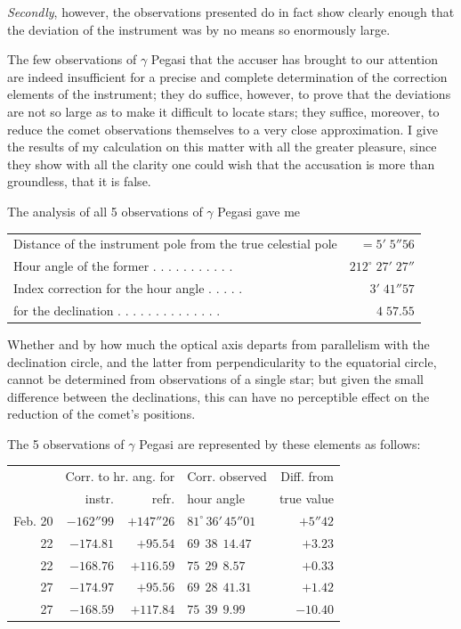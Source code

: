 \emph{Secondly}, however, the observations presented do in fact show clearly enough that the deviation of the instrument was by no means so enormously large.

The few observations of $\gamma$ Pegasi that the accuser has brought to our attention are indeed insufficient for a precise and complete determination of the correction elements of the instrument; they do suffice, however, to prove that the deviations are not so large as to make it difficult to locate stars; they suffice, moreover, to reduce the comet observations themselves to a very close approximation. I give the results of my calculation on this matter with all the greater pleasure, since they show with all the clarity one could wish that the accusation is more than groundless, that it is false.

The analysis of all 5 observations of $\gamma$ Pegasi gave me
\begin{center}\footnotesize\setlength{\tabcolsep}{3pt}
\begin{tabular}{@{}l r@{}}
Distance of the instrument pole from the true celestial pole & $=5'\;5''56$\\
Hour angle of the former . . . . . . . . . . . & $212^\circ\;27'\;27''$\\
Index correction for the hour angle . . . . . & $3'\;41''57$\\
for the declination . . . . . . . . . . . . . . & $4\;57.55$
\end{tabular}\end{center}

Whether and by how much the optical axis departs from parallelism with the declination circle, and the latter from perpendicularity to the equatorial circle, cannot be  determined from observations of a single star; but given the small difference between the declinations, this can have no perceptible effect on the reduction of the comet's positions.

The 5 observations of $\gamma$ Pegasi are represented by these elements
as follows:

\begin{center}\footnotesize\setlength{\tabcolsep}{4pt}
\begin{tabular}{r|r|r|l|r}
 & \multicolumn{2}{c|}{Corr. to hr. ang. for} & Corr. observed & Diff. from\\
 & instr. & refr. & hour angle & true value \\
\hline
Feb. 20 & $-162''99$ & $+147''26$ & $81^\circ\,36'\,45''01$ & $+5''42$ \\
22 & $-174.81$ & $+95.54$ & $69\ \ 38\ \ 14.47$ & $+3.23$ \\
22 & $-168.76$ & $+116.59$ & $75\ \ 29\ \ 8.57$ & $+0.33$ \\
27 & $-174.97$ & $+95.56$ & $69\ \ 28\ \ 41.31$ & $+1.42$ \\
27 & $-168.59$ & $+117.84$ & $75\ \ 39\ \ 9.99$ & $-10.40$ \\
\end{tabular}
\end{center}

